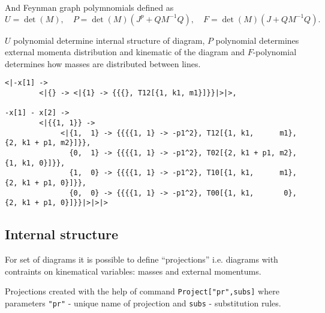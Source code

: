 \documentclass[a4paper,11pt]{article}
\begin{document}
And Feynman graph polymnomials defined as
\begin{equation}
  \label{eq:UFMdef}
  U=\det(M),\quad P=\det(M)(J^p+QM^{-1}Q),\quad F=\det(M)(J+QM^{-1}Q).
\end{equation}

$U$ polynomial determine internal structure of diagram, $P$ polynomial
determines external momenta distribution and kinematic of the diagram
and $F$-polynomial determines how masses are distributed between lines.


\begin{verbatim}
<|-x[1] -> 
        <|{} -> <|{1} -> {{{}, T12[{1, k1, m1}]}}|>|>, 

-x[1] - x[2] -> 
        <|{{1, 1}} -> 
             <|{1,  1} -> {{{{1, 1} -> -p1^2}, T12[{1, k1,      m1}, {2, k1 + p1, m2}]}}, 
               {0,  1} -> {{{{1, 1} -> -p1^2}, T02[{2, k1 + p1, m2}, {1, k1, 0}]}}, 
               {1,  0} -> {{{{1, 1} -> -p1^2}, T10[{1, k1,      m1}, {2, k1 + p1, 0}]}}, 
               {0,  0} -> {{{{1, 1} -> -p1^2}, T00[{1, k1,       0}, {2, k1 + p1, 0}]}}|>|>|>
\end{verbatim}

\subsection{Internal structure}

For set of diagrams it is possible to define ``projections'' i.e.
diagrams with contraints on kinematical variables: masses and external
momentums.

Projections created with the help of command \texttt{Project["pr",subs]} where
parameters \texttt{"pr"} - unique name of projection and \texttt{subs}
- substitution rules.



 
\end{document}
